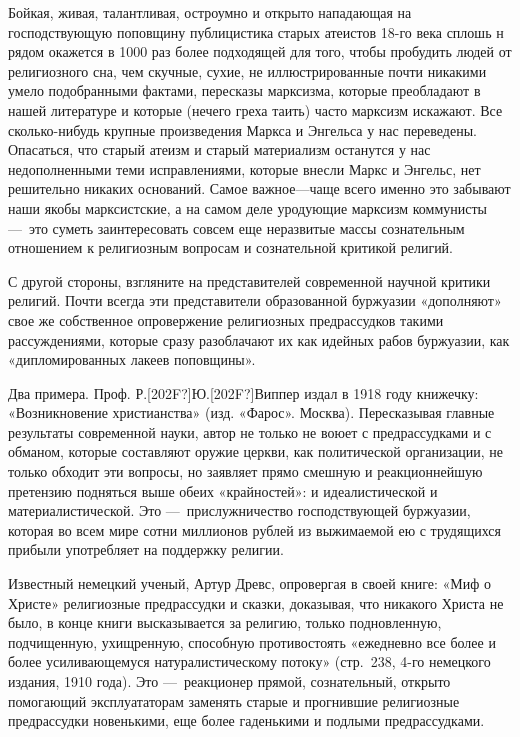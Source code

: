\documentclass[twoside]{article}
\begin{document}
Бойкая, живая, талантливая, остроумно и открыто нападающая на господствующую
поповщину публицистика старых атеистов 18-го века сплошь н рядом окажется в
1000 раз более подходящей для того, чтобы пробудить людей от религиозного
сна, чем скучные, сухие, не иллюстрированные почти никакими умело
подобранными фактами, пересказы марксизма, которые преобладают в нашей
литературе и которые (нечего греха таить) часто марксизм искажают. Все
сколько-нибудь крупные произведения Маркса и Энгельса у нас переведены.
Опасаться, что старый атеизм и старый материализм останутся у нас
недополненными теми исправлениями, которые внесли Маркс и Энгельс, нет
решительно никаких оснований. Самое важное—чаще всего именно это забывают
наши якобы марксистские, а на самом деле уродующие марксизм коммунисты
—~это суметь заинтересовать совсем еще неразвитые массы сознательным
отношением к религиозным вопросам и сознательной критикой религий.

С другой стороны, взгляните на представителей современной научной критики
религий. Почти всегда эти представители образованной буржуазии «дополняют»
свое же собственное опровержение религиозных предрассудков такими
рассуждениями, которые сразу разоблачают их как идейных рабов буржуазии,
как «дипломированных лакеев поповщины».

Два примера. Проф. Р.\textlatin{[202F?]}Ю.\textlatin{[202F?]}Виппер издал в
1918 году книжечку: «Возникновение христианства» (изд. «Фарос». Москва).
Пересказывая главные результаты современной науки, автор не только не воюет
с предрассудками и с обманом, которые составляют оружие церкви, как
политической организации, не только обходит эти вопросы, но заявляет прямо
смешную и реакционнейшую претензию подняться выше обеих «крайностей»: и
идеалистической и материалистической. Это —~прислужничество господствующей
буржуазии, которая во всем мире сотни миллионов рублей из выжимаемой ею с
трудящихся прибыли употребляет на поддержку религии.

Известный немецкий ученый, Артур Древс, опровергая в своей книге: «Миф о
Христе» религиозные предрассудки и сказки, доказывая, что никакого Христа
не было, в конце книги высказывается за религию, только подновленную,
подчищенную, ухищренную, способную противостоять «ежедневно все более и
более усиливающемуся натуралистическому потоку» (стр.~238, 4-го немецкого
издания, 1910 года). Это —~реакционер прямой, сознательный, открыто
помогающий эксплуататорам заменять старые и прогнившие религиозные
предрассудки новенькими, еще более гаденькими и подлыми предрассудками.
\end{document}
